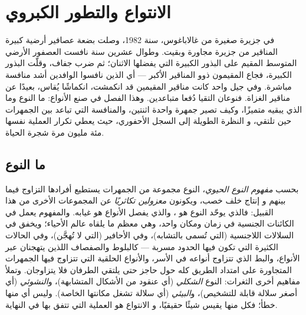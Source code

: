 \chapter{الانتواع والتطور الكبروي}\label{ch:b2:speciation}

في جزيرة صغيرة من غالاباغوس، سنة 1982، وصلت بضعة عصافير
أرضية كبيرة المناقير من جزيرة مجاورة وبقيت. وطوال
عشرين سنة نافست العصفور الأرضي المتوسط المقيم
على البذور الكبيرة التي يفضلها الاثنان؛ ثم ضرب جفاف، وقلّت
البذور الكبيرة، فجاع المقيمون ذوو المناقير الأكبر ---
أي الذين نافسوا الوافدين أشد منافسة مباشرة.
وفي جيل واحد كانت مناقير المقيمين قد انكمشت، انكماشًا يُقاس،
بعيدًا عن مناقير الغزاة. فنوعان التقيا دُفعا
متباعدين. وهذا الفصل في صنع الأنواع: ما النوع
وما الذي يبقيه متميزًا، وكيف تصير جمهرة واحدة اثنتين،
والمنافسة التي تباعد بين الجمهرات حين تلتقي، و
النظرة الطويلة إلى السجل الأحفوري، حيث يعطي تكرار العملية نفسها
مئة مليون مرة شجرة الحياة.

\section{ما النوع}

\begin{definition}[النوع]\label{def:b2:speciation:species}
بحسب \emph{مفهوم النوع الحيوي}، النوع مجموعة
من الجمهرات يستطيع أفرادها التزاوج فيما بينهم و
إنتاج خلف خصب، ويكونون \emph{معزولين تكاثريًا}
عن المجموعات الأخرى من هذا القبيل: فالذي يوحّد النوع هو ،
والذي يفصل الأنواع هو غيابه. والمفهوم يعمل في
الكائنات الجنسية في زمان ومكان واحد، وهي معظم ما يلقاه
عالم الأحياء؛ ويخفق في السلالات اللاجنسية (التي تُسمى
بالتشابه)، وفي الأحافير (التي لا تُهجَّن)، وفي
الحالات الكثيرة التي تكون فيها الحدود مسربة --- كالبلوط والصفصاف اللذين
يتهجنان عبر الأنواع، والبط الذي تتزاوج أنواعه في
الأسر، والأنواع الحلقية التي تتزاوج فيها الجمهرات المتجاورة
على امتداد الطريق كله حول حاجز حتى يلتقي الطرفان فلا
يتزاوجان. وتملأ مفاهيم أخرى الثغرات: النوع \emph{الشكلي}
(أي عنقود من الأشكال المتشابهة)، و\emph{النشوئي} (أي أصغر
سلالة قابلة للتشخيص)، و\emph{البيئي} (أي سلالة تشغل
مكانتها الخاصة). وليس أي منها خطأ؛ فكل منها يقيس شيئًا حقيقيًا، و
الانتواع هو العملية التي تتفق بها في النهاية.
\end{definition}


